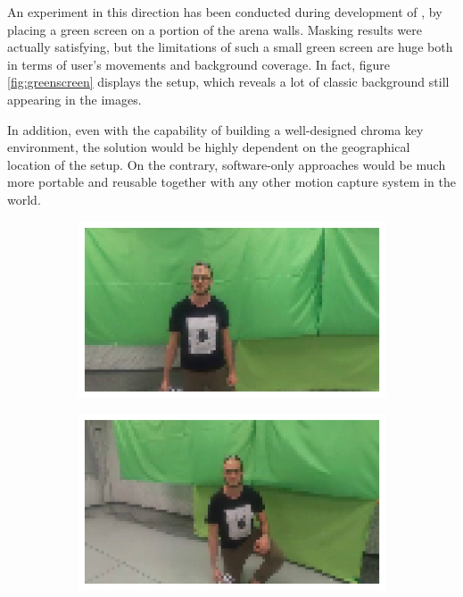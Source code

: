 An experiment in this direction has been conducted during development of \cite{mantegazza2019visionbased}, by placing a green screen on a portion of the arena walls. Masking results were actually satisfying, but the limitations of such a small green screen are huge both in terms of user's movements and background coverage. In fact, figure \ref{fig:greenscreen} displays the setup, which reveals a lot of classic background still appearing in the images.

In addition, even with the capability of building a well-designed chroma key environment, the solution would be highly dependent on the geographical location of the setup. On the contrary, software-only approaches would be much more portable and reusable together with any other motion capture system in the world.

\begin{figure}[!h]
	\begin{center}
		\begin{subfigure}[h]{0.24\textwidth}
			\centering
			\includegraphics[width=1\textwidth]{"contents/images/04-greenscreen-1"}
		\end{subfigure}
		\hfill
		\begin{subfigure}[h]{0.24\textwidth}
			\centering
			\includegraphics[width=1\textwidth]{"contents/images/04-greenscreen-2"}

\end{subfigure}
\end{center}
\end{figure}
